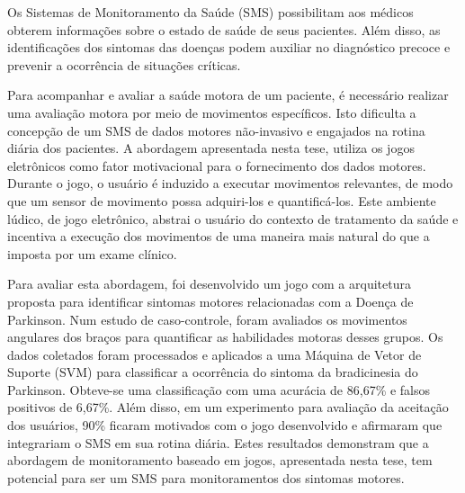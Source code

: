 Os Sistemas de Monitoramento da Saúde (SMS) possibilitam aos médicos obterem informações sobre o estado de saúde de seus pacientes. Além disso, as identificações dos sintomas das doenças podem auxiliar no diagnóstico precoce e prevenir a ocorrência de situações críticas.

Para acompanhar e avaliar a saúde motora de um paciente, é necessário realizar uma avaliação motora por meio de movimentos específicos. Isto dificulta a concepção de um SMS de dados motores não-invasivo e engajados na rotina diária dos pacientes. A abordagem apresentada nesta tese, utiliza os jogos eletrônicos como fator motivacional para o fornecimento dos dados motores. Durante o jogo, o usuário é induzido a executar movimentos relevantes, de modo que um sensor de movimento possa adquiri-los e quantificá-los. Este ambiente lúdico, de jogo eletrônico, abstrai o usuário do contexto de tratamento da saúde e incentiva a execução dos movimentos de uma maneira mais natural do que a imposta por um exame clínico.

Para avaliar esta abordagem, foi desenvolvido um jogo com a arquitetura proposta para identificar sintomas motores relacionadas com a Doença de Parkinson. Num estudo de caso-controle, foram avaliados 
os movimentos angulares dos braços ​​para quantificar as habilidades motoras desses grupos. Os dados coletados foram processados ​​e aplicados a uma Máquina de Vetor de Suporte (SVM) para classificar a ocorrência do sintoma da bradicinesia do Parkinson. Obteve-se uma classificação com uma acurácia de 86,67\% e falsos positivos de 6,67\%. Além disso, em um experimento para avaliação da aceitação dos usuários, 90\% ficaram motivados com o jogo desenvolvido e afirmaram que integrariam o SMS em sua rotina diária. Estes resultados demonstram que a abordagem de monitoramento baseado em jogos, apresentada nesta tese, tem potencial para ser um SMS para monitoramentos dos sintomas motores.







